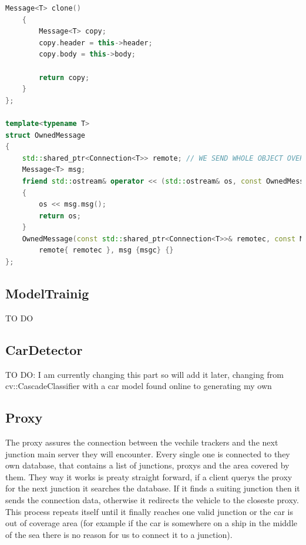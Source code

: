 \documentclass[17pt]{article}
\begin{document}
\begin{lstlisting}[language = C++]
    Message<T> clone()
    {
        Message<T> copy;
        copy.header = this->header;
        copy.body = this->body;

        return copy;
    }
};

template<typename T>
struct OwnedMessage
{
    std::shared_ptr<Connection<T>> remote; // WE SEND WHOLE OBJECT OVER THE NETWORK, NOT THE POINTER;
    Message<T> msg;
    friend std::ostream& operator << (std::ostream& os, const OwnedMessage<T>& msg)
    {
        os << msg.msg();
        return os;
    }
    OwnedMessage(const std::shared_ptr<Connection<T>>& remotec, const Message<T>& msgc) :
        remote{ remotec }, msg {msgc} {}
};
\end{lstlisting}

\pagebreak

\subsection{ModelTrainig}
TO DO
\pagebreak

\subsection{CarDetector} 
TO DO: I am currently changing this part so will add it later, changing 
from cv::CascadeClassifier with a car model found online to generating my own

\pagebreak

\subsection{Proxy}
\indent \indent
The proxy assures the connection between the vechile trackers and the next
junction main server they will encounter. Every single one is connected to 
they own database, that contains a list of junctions, proxys and the area 
covered by them. They way it works is preaty straight forward, if a client 
querys the proxy for the next junction it searches the database. If it finds 
a suiting junction then it sends the connection data, otherwise it redirects 
the vehicle to the closeste proxy. This process repeats itself until it 
finally reaches one valid junction or the car is out of coverage area (for 
example if the car is somewhere on a ship in the middle of the sea there is 
no reason for us to connect it to a junction).
\end{document}
